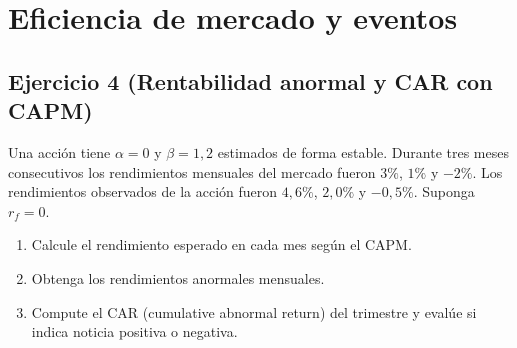 \documentclass[12pt,a4paper]{article}
\newenvironment{ejercicio}[1]{\subsection*{Ejercicio #1}}{}
\begin{document}
 \section{Eficiencia de mercado y eventos}

 \begin{ejercicio}{4 (Rentabilidad anormal y CAR con CAPM)}
 Una acción tiene \(\alpha=0\) y \(\beta=1{,}2\) estimados de forma estable. Durante tres meses consecutivos los rendimientos mensuales del mercado fueron \(3\%\), \(1\%\) y \(-2\%\). Los rendimientos observados de la acción fueron \(4{,}6\%\), \(2{,}0\%\) y \(-0{,}5\%\). Suponga \(r_f=0\).
 \begin{enumerate}[label=\alph*)]
   \item Calcule el rendimiento esperado en cada mes según el CAPM.
   \item Obtenga los rendimientos anormales mensuales.
   \item Compute el CAR (cumulative abnormal return) del trimestre y evalúe si indica noticia positiva o negativa.
 \end{enumerate}
 \end{ejercicio}
\end{document}
